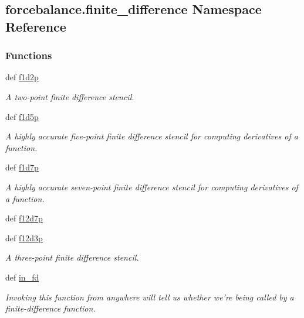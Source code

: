 \hypertarget{namespaceforcebalance_1_1finite__difference}{\subsection{forcebalance.\-finite\-\_\-difference Namespace Reference}
\label{namespaceforcebalance_1_1finite__difference}
}
\subsubsection*{Functions}
\begin{DoxyCompactItemize}
\item 
def \hyperlink{namespaceforcebalance_1_1finite__difference_ac5bb1552a9b8dd22c9c80e6444de2218}{f1d2p}
\begin{DoxyCompactList}\small\item\em A two-\/point finite difference stencil. \end{DoxyCompactList}\item 
def \hyperlink{namespaceforcebalance_1_1finite__difference_a123c5d5dea0f3f50ab57796bb3bc39be}{f1d5p}
\begin{DoxyCompactList}\small\item\em A highly accurate five-\/point finite difference stencil for computing derivatives of a function. \end{DoxyCompactList}\item 
def \hyperlink{namespaceforcebalance_1_1finite__difference_a9be9f0d21300958092e380514e2e980d}{f1d7p}
\begin{DoxyCompactList}\small\item\em A highly accurate seven-\/point finite difference stencil for computing derivatives of a function. \end{DoxyCompactList}\item 
def \hyperlink{namespaceforcebalance_1_1finite__difference_acc281f85b668062745f711d9b4a610fa}{f12d7p}
\item 
def \hyperlink{namespaceforcebalance_1_1finite__difference_aa69a8819e4680091f400303c1d6ddeb7}{f12d3p}
\begin{DoxyCompactList}\small\item\em A three-\/point finite difference stencil. \end{DoxyCompactList}\item 
def \hyperlink{namespaceforcebalance_1_1finite__difference_ad84d3e385db1190e7d8ef58bc08a6c52}{in\-\_\-fd}
\begin{DoxyCompactList}\small\item\em Invoking this function from anywhere will tell us whether we're being called by a finite-\/difference function. \end{DoxyCompactList}\item 

\end{DoxyCompactItemize}
